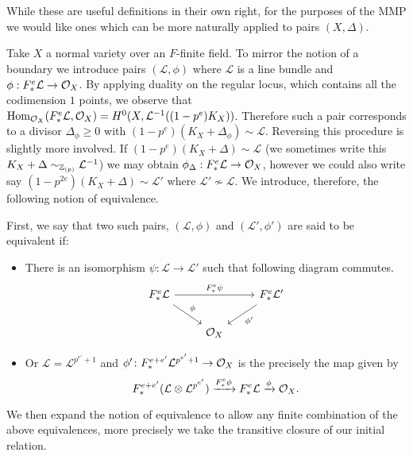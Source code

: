 While these are useful definitions in their own right, for the purposes of the MMP we would like ones which can be more naturally applied to pairs $(X,\Delta)$.

Take $X$ a normal variety over an $F$-finite field. To mirror the notion of a boundary we introduce pairs $(\mathcal{L}, \phi)$ where $\mathcal{L}$ is a line bundle and $\phi: \Fe \mathcal{L} \to \ox$. By applying duality on the regular locus, which contains all the codimension $1$ points, we observe that $\Hom_{\ox}(\Fe \mathcal{L},\ox)=H^{0}(X,\mathcal{L}^{-1}((1-p^{e})K_{X}))$. Therefore such a pair corresponds to a divisor $\Delta_{\phi} \geq 0$ with $(1-p^{e})(K_{X}+\Delta_{\phi}) \sim \mathcal{L}$. Reversing this procedure is slightly more involved. If ${(1-p^{e})(K_{X}+\Delta) \sim \mathcal{L}}$ (we sometimes write this $K_{X}+\Delta \sim_{\zp} \mathcal{L}^{-1}$) we may obtain $\phi_{\Delta}:\Fe \mathcal{L} \to \ox$, however we could also write say $(1-p^{2e})(K_{X}+\Delta) \sim \mathcal{L'}$ where $\mathcal{L'} \not\sim \mathcal{L}$. We introduce, therefore, the following notion of equivalence.

First, we say that two such pairs, $(\mathcal{L}, \phi)$ and $(\mathcal{L}', \phi')$ are said to be equivalent if:

\begin{itemize}
	\item There is an isomorphism $\psi: \mathcal{L} \to \mathcal{L'}$ such that following diagram commutes.
	\[\begin{tikzcd}
	\Fe \mathcal{L} \arrow[rd, "\phi"] \arrow[rr, "\Fe \psi"] &     & \Fe \mathcal{L}' \arrow[ld, "\phi'"] \\
	& \ox &                                     
	\end{tikzcd}\]
	\item Or $\mathcal{L}=\mathcal{L}^{p^{e'}+1}$ and $\phi'\colon \Fe[e+e']\mathcal{L}^{p^{e'}+1}\to \ox$ is the precisely the map given by
		$$\Fe[e+e'](\mathcal{L}\otimes \mathcal{L}^{p^{e'}}) \xrightarrow{\Fe\phi} \Fe \mathcal{L} \xrightarrow{\phi} \ox.$$
		
\end{itemize}

We then expand the notion of equivalence to allow any finite combination of the above equivalences, more precisely we take the transitive closure of our initial relation.

